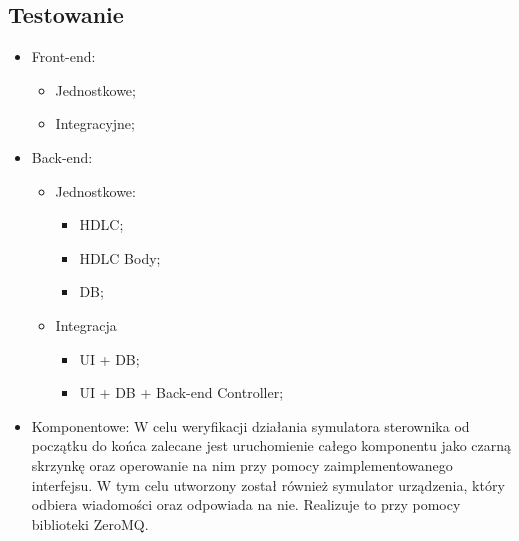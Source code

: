 
\subsection{Testowanie}
\begin{itemize}
\item Front-end:
	\begin{itemize}
		\item Jednostkowe;
		\item Integracyjne;
	\end{itemize}
\item Back-end:
	\begin{itemize}
		\item Jednostkowe:
		\begin{itemize}
			\item HDLC;
			\item HDLC Body;
			\item DB;
		\end{itemize}
		\item Integracja
		\begin{itemize}
			\item UI + DB;
			\item UI + DB + Back-end Controller;
		\end{itemize}
	\end{itemize}
\item Komponentowe:\newline
	W celu weryfikacji działania symulatora sterownika od początku do końca zalecane jest uruchomienie całego komponentu 
	jako czarną skrzynkę oraz operowanie na nim przy pomocy zaimplementowanego interfejsu. W tym celu
	utworzony został również symulator urządzenia, który odbiera wiadomości oraz odpowiada na nie. Realizuje to przy pomocy biblioteki ZeroMQ.
\end{itemize}
